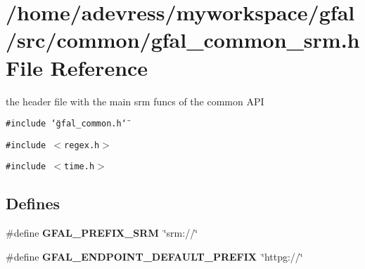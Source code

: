 \section{/home/adevress/myworkspace/gfal/src/common/gfal\_\-common\_\-srm.h File Reference}
\label{gfal__common__srm_8h}
the header file with the main srm funcs of the common API 

{\tt \#include \char`\"{}gfal\_\-common.h\char`\"{}}\par
{\tt \#include $<$regex.h$>$}\par
{\tt \#include $<$time.h$>$}\par
\subsection*{Defines}
\begin{CompactItemize}
\item 
\#define \textbf{GFAL\_\-PREFIX\_\-SRM}~\char`\"{}srm://\char`\"{}\label{gfal__common__srm_8h_c163cc407dc64638a5f13fe1d7ceb858}

\item 
\#define \textbf{GFAL\_\-ENDPOINT\_\-DEFAULT\_\-PREFIX}~\char`\"{}httpg://\char`\"{}\label{gfal__common__srm_8h_496c8a18054866dcb27ae3f3397ac303}

\end{CompactItemize}
